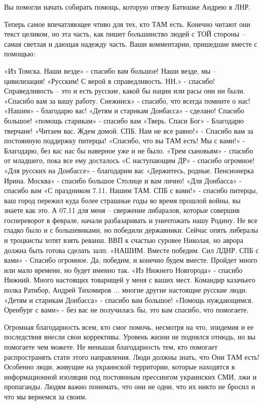 Вы помогли начать собирать помощь, которую отвезу Батюшке Андрею в ЛНР.

Теперь самое впечатляющее чтиво для тех, кто ТАМ есть. Конечно читают они текст
целиком, но эта часть, как пишет большинство людей с ТОЙ стороны – самая
светлая и дающая надежду часть. Ваши комментарии, пришедшие вместе с помощью:

\obeycr
«Из Томска. Наши везде» - спасибо вам большое! Наши везде, мы – цивилизация!
 «Русским! С верой в справедливость. НН.» - спасибо! Справедливость – это и есть русские, какой бы нации или расы они ни были.
 «Спасибо вам за вашу работу. Снежинск» - спасибо, что всегда помните о нас!
 «Нашим» - благодарю вас!
 «Детям и старикам Донбасса» - сделано! Спасибо большое!
 «помощь старикам» - спасибо вам
 «Тверь. Спаси Бог» - Благодарю тверчане!
 «Читаем вас. Ждем домой. СПБ. Нам не все равно!» - Спасибо вам за постоянную поддержку питерцы!
 «Спасибо, что вы ТАМ есть! Мы с вами!» - Благодарю, без вас нас бы наверное уже и не было.
 «Трем сыновьям» - спасибо от младшего, пока все ему досталось
 «С наступающим ДР» - спасибо огромное!
 «Для русских на Донбассе» - благодарим вас
 «Держитесь, родные. Пенсионерка Ирина. Москва» - спасибо большое Столице и вам лично!
 «Для Донбасса» - спасибо вам
 «С праздником 7.11. Нашим ТАМ. СПБ с вами!» - спасибо питерцы, ваш город пережил куда более страшные годы во время прошлой войны, вы знаете как это. А 07.11 для меня – свержение либаралов, которые совершив госпереворот в феврале, начали разбазаривать и уничтожать нашу Родину. Не все гладко было и с большевиками, но победили державники. Сейчас опять либералы и троцкисты хотят взять реванш. ВВП к счастью суровее Николая, но аврора должна быть готова сделать залп.
 «НАШИМ. Вместе победим. Сил ЛДНР. СПБ с вами» - Спасибо огромное. Да, победим, и конечно будем вместе. Пройдет много или мало времени, но будет именно так.
 «Из Нижнего Новгорода» - спасибо Нижний. Много настоящих товарищей у меня с ваших мест. Командир казачьего полка Ратибор, Андрей Тихомиров ... многие другие настоящие русские люди.
 «Детям и старикам Донбасса» - спасибо вам большое!
 «Помощь нуждающимся. Оренбург с вами» - без вас не получилась бы, это вам спасибо, что помогаете.
\restorecr
 

Огромная благодарность всем, кто смог помочь, несмотря на что, эпидемия и ее
последствия внесли свои коррективы. Уровень жизни не поднялся отнюдь, но вы
помогаете чем можете. Не меньшая благодарность тем, кто помогает распространять
стати этого направления. Люди должны знать, что Они ТАМ есть! Особенно люди,
живущие на украинской территории, которые находятся в информационной изоляции
под постоянным прессингом украинских СМИ, лжи и пропаганды. Людям важно
понимать, что они не одни, что их никто не бросил и что мы вернемся за своим.

